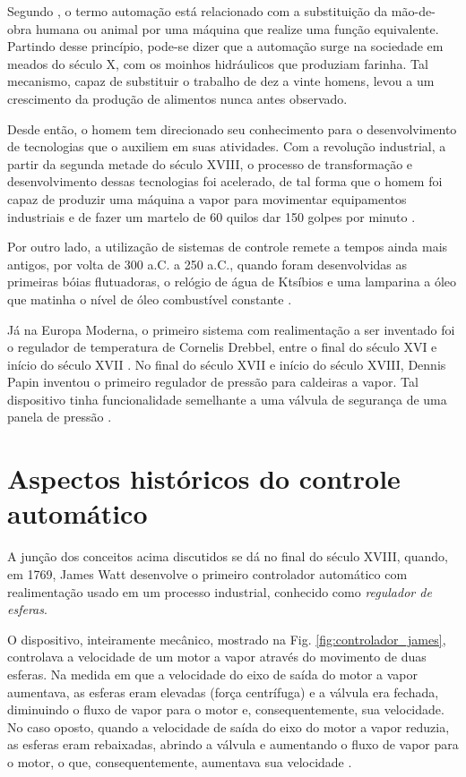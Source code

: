 \label{cap:introducao}

Segundo , o termo automação está relacionado com a
substituição da mão-de-obra humana ou animal por uma máquina que realize uma
função equivalente. Partindo desse princípio, pode-se dizer que a automação
surge na sociedade em meados do século X, com os moinhos hidráulicos que
produziam farinha. Tal mecanismo, capaz de substituir o trabalho de dez a vinte
homens, levou a um crescimento da produção de alimentos nunca antes observado.

Desde então, o homem tem direcionado seu conhecimento para o desenvolvimento de
tecnologias que o auxiliem em suas atividades. Com a revolução industrial, a
partir da segunda metade do século XVIII, o processo de transformação e
desenvolvimento dessas tecnologias foi acelerado, de tal forma que o homem foi
capaz de produzir uma máquina a vapor para movimentar equipamentos industriais e
de fazer um martelo de 60 quilos dar 150 golpes por minuto \cite{goeking:2010}.

Por outro lado, a utilização de sistemas de controle remete a tempos ainda mais
antigos, por volta de 300 a.C. a 250 a.C., quando foram desenvolvidas as
primeiras bóias flutuadoras, o relógio de água de Ktsíbios e uma lamparina a
óleo que matinha o nível de óleo combustível constante
\cite{mayr:1970,mayr:1971,mayr:1975}.

Já na Europa Moderna, o primeiro sistema com realimentação a ser inventado foi o
regulador de temperatura de Cornelis Drebbel, entre o final do século XVI e
início do século XVII \cite{mayr:1975}. No final do século XVII e início do
século XVIII, Dennis Papin inventou o primeiro regulador de pressão para
caldeiras a vapor. Tal dispositivo tinha funcionalidade semelhante a uma válvula
de segurança de uma panela de pressão \cite{dorf:2009}. 

\section{Aspectos históricos do controle automático}
A junção dos conceitos acima discutidos se dá no final do século XVIII, quando,
em 1769, James Watt desenvolve o primeiro controlador automático com
realimentação usado em um processo industrial, conhecido como {\it regulador de
esferas}.

O dispositivo, inteiramente mecânico, mostrado na Fig.
\ref{fig:controlador_james}, controlava a velocidade de um motor a vapor através
do movimento de duas esferas. Na medida em que a velocidade do eixo de saída do
motor a vapor aumentava, as esferas eram elevadas (força centrífuga) e a válvula
era fechada, diminuindo o fluxo de vapor para o motor e, consequentemente, sua
velocidade. No caso oposto, quando a velocidade de saída do eixo do motor a
vapor reduzia, as esferas eram rebaixadas, abrindo a válvula e aumentando o
fluxo de vapor para o motor, o que, consequentemente, aumentava sua velocidade
\cite{mayr:1970,mayr:1975,dorf:2009}.

